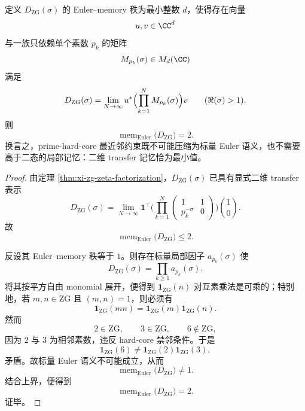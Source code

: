 \begin{theorem}\label{thm:conclusion-zg-euler-memory-rank-two}
定义 \(D_{\mathrm{ZG}}(\sigma)\) 的 Euler--memory 秩为最小整数 \(d\)，使得存在向量
\[
u,v\in\CC^d
\]
与一族只依赖单个素数 \(p_k\) 的矩阵
\[
M_{p_k}(\sigma)\in M_d(\CC)
\]
满足
\[
D_{\mathrm{ZG}}(\sigma)
=
\lim_{N\to\infty}
u^\ast
\Bigl(\prod_{k=1}^{N}M_{p_k}(\sigma)\Bigr)
v
\qquad
(\Re(\sigma)>1).
\]
则
\[
\operatorname{mem}_{\mathrm{Euler}}\!\bigl(D_{\mathrm{ZG}}\bigr)=2.
\]
换言之，prime-hard-core 最近邻约束既不可能压缩为标量 Euler 语义，也不需要高于二态的局部记忆：二维 transfer 记忆恰为最小值。
\end{theorem}
\begin{proof}
由定理 \ref{thm:xi-zg-zeta-factorization}，\(D_{\mathrm{ZG}}(\sigma)\) 已具有显式二维 transfer 表示
\[
D_{\mathrm{ZG}}(\sigma)
=
\lim_{N\to\infty}
\mathbf 1^\top
\Biggl(
\prod_{k=1}^{N}
\begin{pmatrix}
1&1\\
p_k^{-\sigma}&0
\end{pmatrix}
\Biggr)
\binom10.
\]
故
\[
\operatorname{mem}_{\mathrm{Euler}}\!\bigl(D_{\mathrm{ZG}}\bigr)\le 2.
\]

反设其 Euler--memory 秩等于 \(1\)。则存在标量局部因子 \(a_{p_k}(\sigma)\) 使
\[
D_{\mathrm{ZG}}(\sigma)=\prod_{k\ge 1}a_{p_k}(\sigma).
\]
将其按平方自由 monomial 展开，便得到 \(\mathbf 1_{\mathrm{ZG}}(n)\) 对互素乘法是可乘的；特别地，若 \(m,n\in\mathrm{ZG}\) 且 \((m,n)=1\)，则必须有
\[
\mathbf 1_{\mathrm{ZG}}(mn)=\mathbf 1_{\mathrm{ZG}}(m)\mathbf 1_{\mathrm{ZG}}(n).
\]
然而
\[
2\in \mathrm{ZG},
\qquad
3\in \mathrm{ZG},
\qquad
6\notin \mathrm{ZG},
\]
因为 \(2\) 与 \(3\) 为相邻素数，违反 hard-core 禁邻条件。于是
\[
\mathbf 1_{\mathrm{ZG}}(6)\neq \mathbf 1_{\mathrm{ZG}}(2)\mathbf 1_{\mathrm{ZG}}(3),
\]
矛盾。故标量 Euler 语义不可能成立，从而
\[
\operatorname{mem}_{\mathrm{Euler}}\!\bigl(D_{\mathrm{ZG}}\bigr)\neq 1.
\]
结合上界，便得到
\[
\operatorname{mem}_{\mathrm{Euler}}\!\bigl(D_{\mathrm{ZG}}\bigr)=2.
\]
证毕。
\end{proof}

